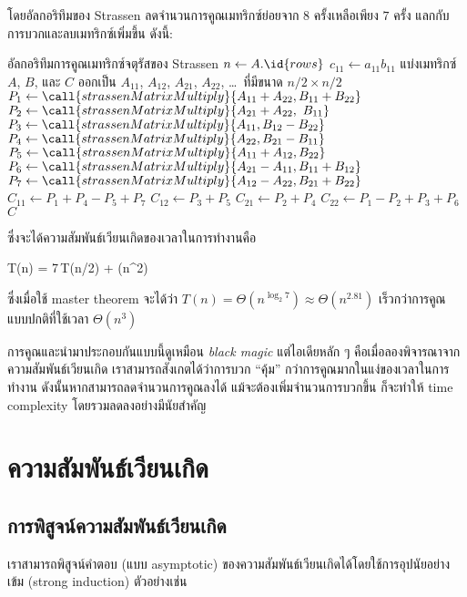 โดยอัลกอริทึมของ Strassen ลดจำนวนการคูณเมทริกซ์ย่อยจาก $8$ ครั้งเหลือเพียง $7$ ครั้ง แลกกับการบวกและลบเมทริกซ์เพิ่มขึ้น ดังนี้:
\begin{icodebox}{อัลกอริทึมการคูณเมทริกซ์จตุรัสของ Strassen}
		\State $n \gets A.\id{rows}$
			\State $c_{11} \gets a_{11}b_{11}$
		\Else
			\State แบ่งเมทริกซ์ $A$, $B$, และ $C$ ออกเป็น $A_{11}$, $A_{12}$, $A_{21}$, $A_{22}$, \dots\ ที่มีขนาด $n/2 \times n/2$
			\State $P_1 \gets \call{strassenMatrixMultiply}{A_{11} + A_{22}, B_{11} + B_{22}}$
			\State $P_2 \gets \call{strassenMatrixMultiply}{A_{21} + A_{22},\ B_{11}}$
			\State $P_3 \gets \call{strassenMatrixMultiply}{A_{11}, B_{12} - B_{22}}$
			\State $P_4 \gets \call{strassenMatrixMultiply}{A_{22}, B_{21} - B_{11}}$
			\State $P_5 \gets \call{strassenMatrixMultiply}{A_{11} + A_{12}, B_{22}}$
			\State $P_6 \gets \call{strassenMatrixMultiply}{A_{21} - A_{11}, B_{11} + B_{12}}$
			\State $P_7 \gets \call{strassenMatrixMultiply}{A_{12} - A_{22}, B_{21} + B_{22}}$
			\State $C_{11} \gets P_1 + P_4 - P_5 + P_7$
			\State $C_{12} \gets P_3 + P_5$
			\State $C_{21} \gets P_2 + P_4$
			\State $C_{22} \gets P_1 - P_2 + P_3 + P_6$
		\EndIf
		\State \Return $C$
	\EndFunction
\end{icodebox}
ซึ่งจะได้ความสัมพันธ์เวียนเกิดของเวลาในการทำงานคือ
\begin{eqnobox}
	T(n) = 7\,T(n/2) + \Theta(n^2)
\end{eqnobox}
ซึ่งเมื่อใช้ master theorem จะได้ว่า $T(n) = \Theta(n^{\log_2 7}) \approx \Theta(n^{2.81})$ เร็วกว่าการคูณแบบปกติที่ใช้เวลา $\Theta(n^3)$

การคูณและนำมาประกอบกันแบบนี้ดูเหมือน \emph{black magic} แต่ไอเดียหลัก ๆ คือเมื่อลองพิจารณาจากความสัมพันธ์เวียนเกิด เราสามารถสังเกตได้ว่าการบวก ``คุ้ม'' กว่าการคูณมากในแง่ของเวลาในการทำงาน ดังนั้นหากสามารถลดจำนวนการคูณลงได้ แม้จะต้องเพิ่มจำนวนการบวกขึ้น ก็จะทำให้ time complexity โดยรวมลดลงอย่างมีนัยสำคัญ

\section{ความสัมพันธ์เวียนเกิด}

\subsection{การพิสูจน์ความสัมพันธ์เวียนเกิด}

เราสามารถพิสูจน์คำตอบ (แบบ asymptotic) ของความสัมพันธ์เวียนเกิดได้โดยใช้การอุปนัยอย่างเข้ม (strong induction) ตัวอย่างเช่น

